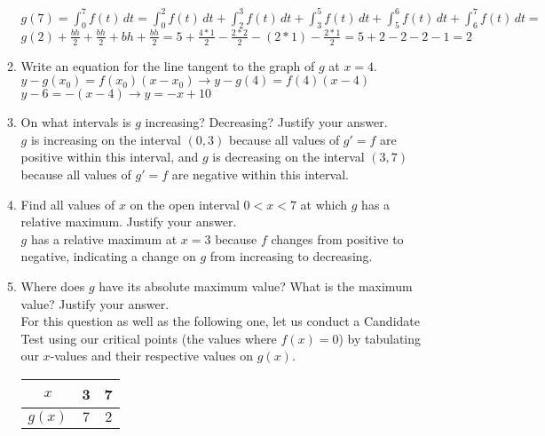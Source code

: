 \documentclass[10pt, letterpaper]{report}
\begin{document}
\begin{enumerate}
\begin{enumerate}
      $g(7) = \int_{0}^{7}{f(t)}\,dt =
      \int_{0}^{2}{f(t)}\,dt + \int_{2}^{3}{f(t)}\,dt + \int_{3}^{5}{f(t)}\,dt + \int_{5}^{6}{f(t)}\,dt + \int_{6}^{7}{f(t)}\,dt = $ \\

      $g(2) + \frac{bh}{2} + \frac{bh}{2} + bh + \frac{bh}{2} = 5 + \frac{4*1}{2} - \frac{2*2}{2} - (2*1) - \frac{2*1}{2} =
      5 + 2 - 2 - 2 - 1 = 2$ \\

    \item{Write an equation for the line tangent to the graph of $g$ at $x=4$.} \\

      $y - g(x_{0}) = f(x_{0})(x - x_{0}) \rightarrow
      y - g(4) = f(4)(x - 4)$ \\

      $y - 6 = -(x-4) \rightarrow y = -x + 10$ \\

    \item{On what intervals is $g$ increasing? Decreasing? Justify your answer.} \\

      $g$ is increasing on the interval $(0,3)$ because all values of $g' = f$ are positive within this interval, and $g$ is decreasing on the interval $(3,7)$ because all values of $g' = f$ are negative within this interval. \\

    \item{Find all values of $x$ on the open interval $0<x<7$ at which $g$ has a relative maximum. Justify your answer.} \\

      $g$ has a relative maximum at $x=3$ because $f$ changes from positive to negative, indicating a change on $g$ from increasing to decreasing. \\

    \item{Where does $g$ have its absolute maximum value? What is the maximum value? Justify your answer.} \\

      For this question as well as the following one, let us conduct a Candidate Test using our critical points (the values where $f(x)=0$) by tabulating our $x$-values and their respective values on $g(x)$.

      \begin{center}
        \begin{tabular}{| c | c | c |}
          \hline
          $x$ & 3 & 7 \\
          \hline
          $g(x)$ & $7$ & $2$  \\
          \hline
        \end{tabular}
      \end{center}


\end{enumerate}
\end{enumerate}
\end{document}
